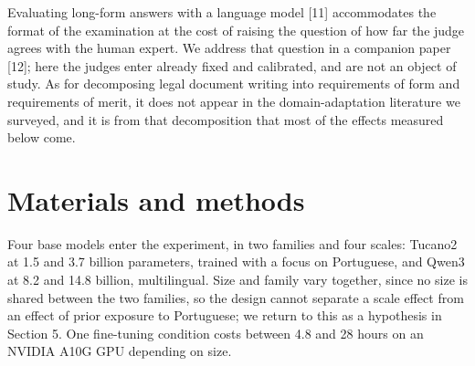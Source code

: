 \documentclass{IOS-Book-Article}
\begin{document}
Evaluating long-form answers with a language model [11] accommodates the format of the examination at the cost of raising the question of how far the judge agrees with the human expert. We address that question in a companion paper [12]; here the judges enter already fixed and calibrated, and are not an object of study. As for decomposing legal document writing into requirements of form and requirements of merit, it does not appear in the domain-adaptation literature we surveyed, and it is from that decomposition that most of the effects measured below come.
\section{Materials and methods}
Four base models enter the experiment, in two families and four scales: Tucano2 at 1.5 and 3.7 billion parameters, trained with a focus on Portuguese, and Qwen3 at 8.2 and 14.8 billion, multilingual. Size and family vary together, since no size is shared between the two families, so the design cannot separate a scale effect from an effect of prior exposure to Portuguese; we return to this as a hypothesis in Section 5. One fine-tuning condition costs between 4.8 and 28 hours on an NVIDIA A10G GPU depending on size.
\end{document}
